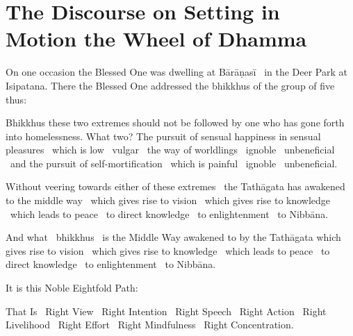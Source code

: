 \section{The Discourse on Setting in Motion the Wheel of Dhamma}
\label{wheel-of-dhamma-full}

\begin{english-hang}
 On one occasion the Blessed One was dwelling at Bārāṇasī \breathmark\ in the Deer Park at Isipatana. There the Blessed One addressed the bhikkhus of the group of five thus:
\end{english-hang}

\begin{english-hang}
Bhikkhus these two extremes should not be followed by one who has gone forth into homelessness. What two? The pursuit of sensual happiness in sensual pleasures \breathmark\ which is low \breathmark\ vulgar \breathmark\ the way of worldlings \breathmark\ ignoble \breathmark\ unbeneficial \breathmark\ and the pursuit of self-mortification \breathmark\ which is painful \breathmark\ ignoble \breathmark\ unbeneficial.
\end{english-hang}

\begin{english-hang}
Without veering towards either of these extremes \breathmark\ the Tathāgata has awakened to the middle way \breathmark\ which gives rise to vision \breathmark\ which gives rise to knowledge \breathmark\ which leads to peace \breathmark\ to direct knowledge \breathmark\ to enlightenment \breathmark\ to Nibbāna.
\end{english-hang}

\begin{english-hang}
And what \breathmark\ bhikkhus \breathmark\ is the Middle Way awakened to by the Tathāgata which gives rise to vision \breathmark\ which gives rise to knowledge \breathmark\ which leads to peace \breathmark\ to direct knowledge \breathmark\ to enlightenment \breathmark\ to Nibbāna.
\end{english-hang}

\begin{english-hang}
It is this Noble Eightfold Path:
\end{english-hang}

\begin{english-hang}
That Is \breathmark\ Right View \breathmark\ Right Intention \breathmark\ Right Speech \breathmark\ Right Action \breathmark\ Right Livelihood \breathmark\ Right Effort \breathmark\ Right Mindfulness \breathmark\ Right Concentration.
\end{english-hang}

